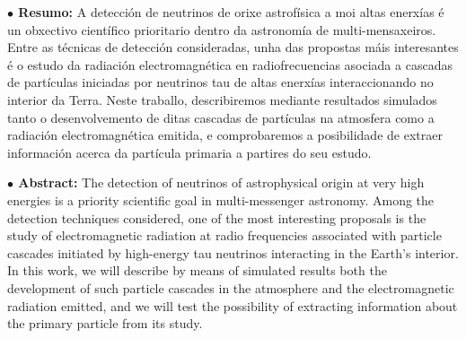 \documentclass[11 pt, a4paper]{article} %
\numberwithin{equation}{section}
\numberwithin{figure}{section}
\numberwithin{table}{section}
\begin{document}
	\begin{flushleft}  {\bf $\bullet$ Resumo:\;\;}
		A detección de neutrinos de orixe astrofísica a moi altas enerxías é un obxectivo científico prioritario dentro da astronomía de multi-mensaxeiros. Entre as técnicas de detección consideradas, unha das propostas máis interesantes é o estudo da radiación electromagnética en radiofrecuencias asociada a cascadas de partículas iniciadas por neutrinos tau de altas enerxías interaccionando no interior da Terra. Neste traballo, describiremos mediante resultados simulados tanto o desenvolvemento de ditas cascadas de partículas na atmosfera como a radiación electromagnética emitida, e comprobaremos a posibilidade de extraer información acerca da partícula primaria a partires do seu estudo.
	\end{flushleft}\mbox{}
	
	
	\begin{flushleft}  {\bf $\bullet$ Abstract:\;\;}
		The detection of neutrinos of astrophysical origin at very high energies is a priority scientific goal in multi-messenger astronomy. Among the detection techniques considered, one of the most interesting proposals is the study of electromagnetic radiation at radio frequencies associated with particle cascades initiated by high-energy tau neutrinos interacting in the Earth's interior. In this work, we will describe by means of simulated results both the development of such particle cascades in the atmosphere and the electromagnetic radiation emitted, and we will test the possibility of extracting information about the primary particle from its study.
	\end{flushleft}\mbox{}
	
	\clearpage
	\pagestyle{fancy}
	\fancyhead{}
	\lhead{}
	\rhead{}
	\chead{}
	\renewcommand{\headrulewidth}{0.1pt}
	\lfoot{} 
	\cfoot{\thepage}
	\rfoot{} 
	\renewcommand{\footrulewidth}{0pt}
	
	\setcounter{page}{1}
	\tableofcontents
	\clearpage
	
\end{document}
